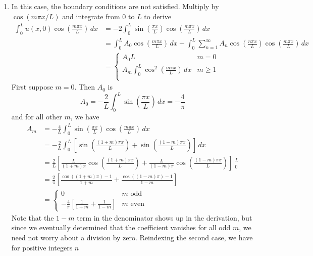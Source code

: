 \documentclass[a4paper]{article}
\begin{document}
\begin{enumerate}[label=(\alph*)]
	\item In this case, the boundary conditions are not satisfied. Multiply by \( \cos\!\left(m \pi x / L\right) \) and integrate from \( 0 \) to \( L \) to derive
	\begin{align*}
		\int^{L}_{0} u \!\left( x,0 \right)\cos\!\left(\frac{m \pi x}{L}\right) \, dx & = -2\int^{L}_{0} \sin\!\left(\frac{\pi x}{L}\right)\cos\!\left(\frac{m \pi x}{L}\right) \, dx \\
		 & = \int^{L}_{0} A_{0}\cos\!\left(\frac{m \pi x}{L}\right) \, dx + \int^{L}_{0} \sum^{\infty}_{n=1} A_{n}\cos\!\left(\frac{n \pi x}{L}\right)\cos\!\left(\frac{m \pi x}{L}\right) \, dx \\
		 & = \begin{cases}
		 	A_{0}L & m = 0 \\
			\displaystyle{A_{m}\int^{L}_{0} \cos^{2}\!\left(\frac{m \pi x}{L}\right) \, dx} & m \ge 1 \\
		 \end{cases}
	\end{align*}
	First suppose \( m = 0 \). Then \( A_{0} \) is
	\[
		A_{0} = -\frac{2}{L}\int^{L}_{0} \sin\!\left(\frac{\pi x}{L}\right) \, dx = -\frac{4}{\pi} 
	\]
	and for all other \( m \), we have
	\begin{align*}
		A_{m} & = -\frac{4}{L}\int^{L}_{0} \sin\!\left(\frac{\pi x}{L}\right)\cos\!\left(\frac{m \pi x}{L}\right) \, dx \\
		 & = -\frac{2}{L}\int^{L}_{0} \!\left[ \sin\!\left(\frac{\!\left( 1 + m \right)\pi x}{L}\right) + \sin\!\left(\frac{\!\left( 1 - m \right)\pi x}{L}\right) \right] \, dx \\ 
		 & = \frac{2}{L} \!\left[ \frac{L}{\!\left( 1 + m \right)\pi}\cos\!\left(\frac{\!\left( 1 + m \right)\pi x}{L}\right) + \frac{L}{\!\left( 1 - m \right)\pi}\cos\!\left(\frac{\!\left( 1 - m \right)\pi x}{L}\right) \right] \Big|^{L}_{0} \\
		 & = \frac{2}{\pi}\!\left[ \frac{\cos\!\left(\!\left( 1 + m \right)\pi\right) - 1}{1 + m} + \frac{\cos\!\left(\!\left( 1 - m \right)\pi\right) - 1}{1 - m} \right] \\
		 & = \begin{cases}
		 	0 & m \text{ odd} \\
			\displaystyle{-\frac{4}{\pi}\!\left[ \frac{1}{1 + m} + \frac{1}{1 - m} \right]} & m \text{ even}
		 \end{cases}
	\end{align*}
	Note that the \( 1 - m \) term in the denominator shows up in the derivation, but since we eventually determined that the coefficient vanishes for all odd \( m \), we need not worry about a division by zero. Reindexing the second case, we have for positive integers \( n \)

\end{enumerate}
\end{document}
